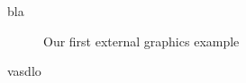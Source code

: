\documentclass{article}
\begin{document}
bla

\begin{figure}
\caption{Our first external graphics example}
\end{figure}

vasdlo
\end{document}
